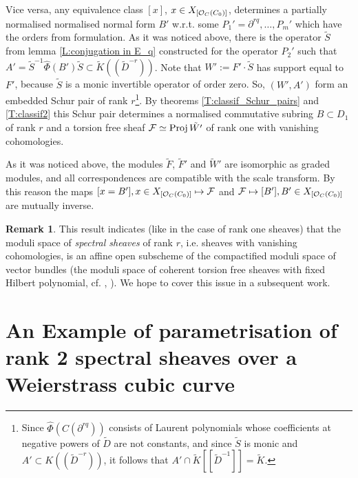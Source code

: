 \documentclass[11pt]{article}
\theoremstyle{definition}
\newcommand{\Projj}{\mathop {\rm Proj}}
\newtheorem{rem}{Remark}[section]
\theoremstyle{plain}
\numberwithin{equation}{section}
\newcommand{\co}{{{\cal O}}}
\newcommand{\cf}{{{\cal F}}}
\begin{document}
Vice versa, any equivalence class $[x]$, $x\in X_{[\co_C(C_0)]}$,  determines a partially normalised normalised normal form $B'$ w.r.t. some $P_1'=\partial^{rq}, \ldots ,P_m'$ which have the orders from formulation. As it was noticed above, there is the operator $\tilde{S}$  from lemma \ref{L:conjugation in E_q} constructed for the operator $P_2'$ such that $A'=\tilde{S}^{-1}\hat{\Phi}(B')\tilde{S}\subset \tilde{K}((\tilde{D}^{-r}))$. Note that $W':=F'\cdot \tilde{S}$ has support equal to $F'$, because $\tilde{S}$ is a monic invertible operator of order zero. So, $(W', A')$ form an embedded Schur pair of rank $r$\footnote{Since  $\hat{\Phi}(C(\partial^{rq}))$  consists of Laurent polynomials whose coefficients at negative powers of $\tilde{D}$ are not constants, and since $\tilde{S}$ is monic and $A'\subset K((\tilde{D}^{-r}))$, it follows that $A'\cap \tilde{K}[[\tilde{D}^{-1}]]=\tilde{K}$.}. By theorems \ref{T:classif_Schur_pairs} and \ref{T:classif2} this Schur pair determines a normalised commutative subring $B\subset D_1$ of rank $r$ and a torsion free sheaf $\cf\simeq \Projj \tilde{W'}$ of rank one with vanishing cohomologies. 

As it was noticed above, the modules $\tilde{F}$, $\tilde{F}'$ and $\tilde{W}'$ are isomorphic as graded  modules, and all correspondences are compatible with the scale transform. By this reason the maps $[x=B'], x\in X_{[\co_C(C_0)]} \mapsto \cf$ and $\cf \mapsto [B'], B'\in X_{[\co_C(C_0)]}$ are mutually inverse.



\begin{rem}
\label{R:moduli}
This result indicates (like in the case of rank one sheaves) that the moduli space of {\it spectral sheaves} of rank $r$, i.e. sheaves with vanishing cohomologies, is an affine open subscheme of the compactified moduli space of vector bundles (the moduli space of coherent torsion free sheaves with fixed Hilbert polynomial, cf.  \cite{Rego2}, \cite{HL}). We hope to cover this issue in a subsequent work.

\end{rem}




\section{An Example of parametrisation of rank 2 spectral sheaves over a Weierstrass cubic curve}
\label{S:example}
\end{document}
